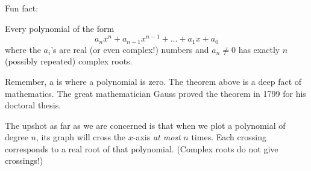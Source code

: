 \documentclass{ximera}
\begin{document}
Fun fact:

\begin{theorem}
  Every polynomial of the form
  \[
  a_n x^n + a_{n-1} x^{n-1} + \dots + a_1 x + a_0
  \]
  where the $a_i$'s are real (or even complex!) numbers and $a_n \ne 0$ has exactly
  $n$ (possibly repeated) complex roots.
\end{theorem}

Remember, a  is where a polynomial is zero. The theorem
above is a deep fact of mathematics. The great mathematician Gauss
proved the theorem in 1799 for his doctoral thesis. 

The upshot as far as we are concerned is that when we plot a
polynomial of degree $n$, its graph will cross the $x$-axis \emph{at most}
$n$ times. Each crossing corresponds to a real root of that polynomial.  (Complex roots do not give crossings!)
\end{document}
